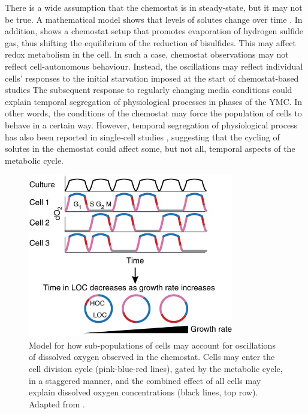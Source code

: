 There is a wide assumption that the chemostat is in steady-state, but it may not be true.
A mathematical model shows that levels of solutes change over time \parencite{jonesCyberneticModelGrowth1999}.
In addition, \textcite{oneillEukaryoticCellBiology2020} shows a chemostat setup that promotes evaporation of hydrogen sulfide gas, thus shifting the equilibrium of the reduction of bisulfides.
This may affect redox metabolism in the cell.
In such a case, chemostat observations may not reflect cell-autonomous behaviour.
Instead, the oscillations may reflect individual cells' responses to the initial starvation imposed at the start of chemostat-based studies
The subsequent response to regularly changing media conditions could explain temporal segregation of physiological processes in phases of the YMC.
In other words, the conditions of the chemostat may force the population of cells to behave in a certain way.
However, temporal segregation of physiological process has also been reported in single-cell studies \parencite{takhaveevTemporalSegregationBiosynthetic2023}, suggesting that the cycling of solutes in the chemostat could affect some, but not all, temporal aspects of the metabolic cycle.

\begin{figure}
  \centering
  \includegraphics[width=0.8\textwidth]{mellorMolecularBasisMetabolic2016_3b_adapted}
  \caption{
    Model for how sub-populations of cells may account for oscillations of dissolved oxygen observed in the chemostat.
    Cells may enter the cell division cycle (pink-blue-red lines), gated by the metabolic cycle, in a staggered manner, and the combined effect of all cells may explain dissolved oxygen concentrations (black lines, top row).
    Adapted from \textcite{mellorMolecularBasisMetabolic2016}.}
  \label{fig:intro-ymc-populations}
\end{figure}

